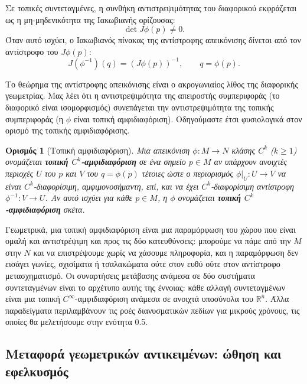 \documentclass[11pt,a4paper,twoside,openright]{book}
\newtheorem{definition}[lemma]{Ορισμός}
\begin{document}
Σε τοπικές συντεταγμένες, η συνθήκη αντιστρεψιμότητας του διαφορικού εκφράζεται ως η μη-μηδενικότητα της Ιακωβιανής ορίζουσας:
\begin{equation}
\det J\phi(p) \neq 0. \label{eq:inv-cond}
\end{equation}
Όταν αυτό ισχύει, ο Ιακωβιανός πίνακας της αντίστροφης απεικόνισης δίνεται από τον αντίστροφο του $J\phi(p)$:
\begin{equation}
J(\phi^{-1})(q) = (J\phi(p))^{-1}, \qquad q = \phi(p). \label{eq:inv-jac}
\end{equation}

Το θεώρημα της αντίστροφης απεικόνισης είναι ο ακρογωνιαίος λίθος της διαφορικής γεωμετρίας. Μας λέει ότι η αντιστρεψιμότητα της απειροστής συμπεριφοράς (το διαφορικό είναι ισομορφισμός) συνεπάγεται την αντιστρεψιμότητα της τοπικής συμπεριφοράς (η $\phi$ είναι τοπική αμφιδιαφόριση). Οδηγούμαστε έτσι φυσιολογικά στον ορισμό της τοπικής αμφιδιαφόρισης.

\begin{definition}[Τοπική αμφιδιαφόριση]
Μια απεικόνιση $\phi: M \to N$ κλάσης $C^k$ ($k \geq 1$) ονομάζεται \textbf{τοπική $C^k$-αμφιδιαφόριση} σε ένα σημείο $p \in M$ αν υπάρχουν ανοιχτές περιοχές $U$ του $p$ και $V$ του $q = \phi(p)$ τέτοιες ώστε ο περιορισμός $\phi|_U: U \to V$ να είναι $C^k$-διαφορίσιμη, αμφιμονοσήμαντη, επί, και να έχει $C^k$-διαφορίσιμη αντίστροφη $\phi^{-1}: V \to U$. Αν αυτό ισχύει για κάθε $p \in M$, η $\phi$ ονομάζεται \textbf{τοπική $C^k$-αμφιδιαφόριση} σκέτα.
\end{definition}

Γεωμετρικά, μια τοπική αμφιδιαφόριση είναι μια παραμόρφωση του χώρου που είναι ομαλή και αντιστρέψιμη και προς τις δύο κατευθύνσεις: μπορούμε να πάμε από την $M$ στην $N$ και να επιστρέψουμε χωρίς να χάσουμε πληροφορία, και η παραμόρφωση δεν εισάγει γωνίες, σχισίματα ή τσαλακώματα ούτε στον ευθύ ούτε στον αντίστροφο μετασχηματισμό. Οι συναρτήσεις μετάβασης ανάμεσα σε δύο συστήματα συντεταγμένων είναι το αρχέτυπο αυτής της έννοιας: κάθε αλλαγή συντεταγμένων είναι μια τοπική $C^\infty$-αμφιδιαφόριση ανάμεσα σε ανοιχτά υποσύνολα του $\mathbb{R}^n$. Άλλα παραδείγματα περιλαμβάνουν τις ροές διανυσματικών πεδίων για μικρούς χρόνους, τις οποίες θα μελετήσουμε στην ενότητα 0.5.

\subsection{Μεταφορά γεωμετρικών αντικειμένων: ώθηση και εφελκυσμός}
\end{document}
